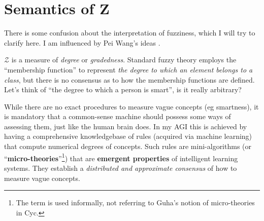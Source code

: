 


%

\section{Semantics of Z}

There is some confusion about the interpretation of fuzziness, which I will try to clarify here.  I am influenced by Pei Wang's ideas \citep*{Wang2006}.

$\mathcal{Z}$ is a measure of \textit{degree} or \textit{gradedness}.  Standard fuzzy theory employs the ``membership function'' to represent \textit{the degree to which an element belongs to a class}, but there is no consensus as to how the membership functions are defined.  Let's think of ``the degree to which a person is smart'', is it really arbitrary?

While there are no exact procedures to measure vague concepts (eg smartness), it is mandatory that a common-sense machine should possess some ways of assessing them, just like the human brain does.  In my AGI this is achieved by having a comprehensive knowledgebase of rules (acquired via machine learning) that compute numerical degrees of concepts.  Such rules are mini-algorithms (or ``\textbf{micro-theories}''\footnote{The term is used informally, not referring to Guha's notion of micro-theories in Cyc.}) that are \textbf{emergent properties} of intelligent learning systems.  They establish a \textit{distributed and approximate consensus} of how to measure vague concepts.

